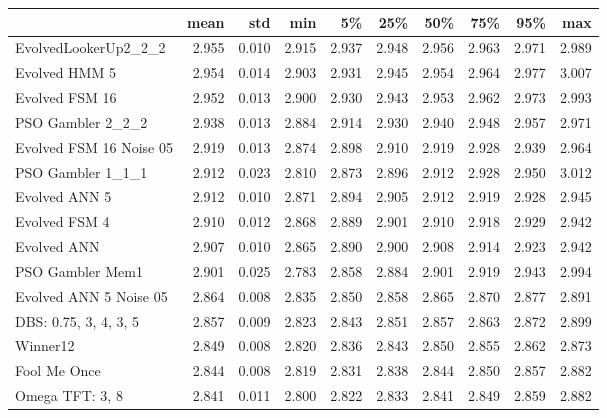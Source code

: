 \begin{tabular}{lrrrrrrrrr}
\toprule
{} &   mean &    std &    min &     5\% &    25\% &    50\% &    75\% &    95\% &    max \\
\midrule
EvolvedLookerUp2\_2\_2    &  2.955 &  0.010 &  2.915 &  2.937 &  2.948 &  2.956 &  2.963 &  2.971 &  2.989 \\
Evolved HMM 5           &  2.954 &  0.014 &  2.903 &  2.931 &  2.945 &  2.954 &  2.964 &  2.977 &  3.007 \\
Evolved FSM 16          &  2.952 &  0.013 &  2.900 &  2.930 &  2.943 &  2.953 &  2.962 &  2.973 &  2.993 \\
PSO Gambler 2\_2\_2       &  2.938 &  0.013 &  2.884 &  2.914 &  2.930 &  2.940 &  2.948 &  2.957 &  2.971 \\
Evolved FSM 16 Noise 05 &  2.919 &  0.013 &  2.874 &  2.898 &  2.910 &  2.919 &  2.928 &  2.939 &  2.964 \\
PSO Gambler 1\_1\_1       &  2.912 &  0.023 &  2.810 &  2.873 &  2.896 &  2.912 &  2.928 &  2.950 &  3.012 \\
Evolved ANN 5           &  2.912 &  0.010 &  2.871 &  2.894 &  2.905 &  2.912 &  2.919 &  2.928 &  2.945 \\
Evolved FSM 4           &  2.910 &  0.012 &  2.868 &  2.889 &  2.901 &  2.910 &  2.918 &  2.929 &  2.942 \\
Evolved ANN             &  2.907 &  0.010 &  2.865 &  2.890 &  2.900 &  2.908 &  2.914 &  2.923 &  2.942 \\
PSO Gambler Mem1        &  2.901 &  0.025 &  2.783 &  2.858 &  2.884 &  2.901 &  2.919 &  2.943 &  2.994 \\
Evolved ANN 5 Noise 05  &  2.864 &  0.008 &  2.835 &  2.850 &  2.858 &  2.865 &  2.870 &  2.877 &  2.891 \\
DBS: 0.75, 3, 4, 3, 5   &  2.857 &  0.009 &  2.823 &  2.843 &  2.851 &  2.857 &  2.863 &  2.872 &  2.899 \\
Winner12                &  2.849 &  0.008 &  2.820 &  2.836 &  2.843 &  2.850 &  2.855 &  2.862 &  2.873 \\
Fool Me Once            &  2.844 &  0.008 &  2.819 &  2.831 &  2.838 &  2.844 &  2.850 &  2.857 &  2.882 \\
Omega TFT: 3, 8         &  2.841 &  0.011 &  2.800 &  2.822 &  2.833 &  2.841 &  2.849 &  2.859 &  2.882 \\
\bottomrule
\end{tabular}
